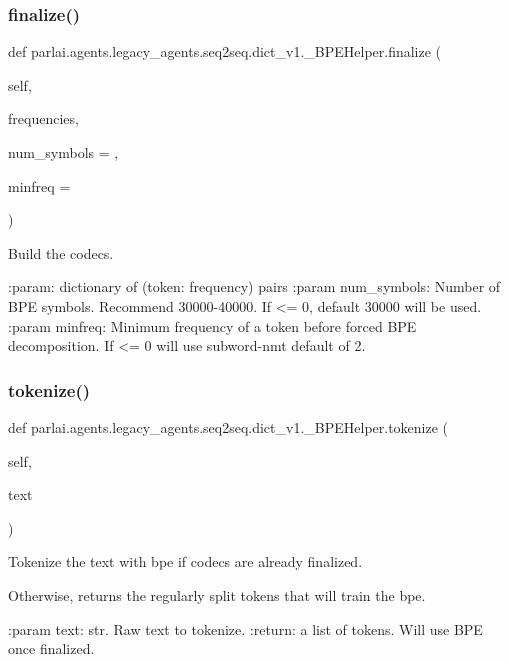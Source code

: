 \subsubsection{\texorpdfstring{finalize()}{finalize()}}
{\footnotesize\ttfamily def parlai.\+agents.\+legacy\+\_\+agents.\+seq2seq.\+dict\+\_\+v1.\+\_\+\+B\+P\+E\+Helper.\+finalize (\begin{DoxyParamCaption}\item[{}]{self,  }\item[{}]{frequencies,  }\item[{}]{num\+\_\+symbols = {},  }\item[{}]{minfreq = {} }\end{DoxyParamCaption})}

\begin{DoxyVerb}Build the codecs.

:param: dictionary of (token: frequency) pairs
:param num_symbols: Number of BPE symbols. Recommend 30000-40000.
    If <= 0, default 30000 will be used.
:param minfreq: Minimum frequency of a token before forced BPE
    decomposition. If <= 0 will use subword-nmt default of 2.
\end{DoxyVerb}
 \mbox{\label{classparlai_1_1agents_1_1legacy__agents_1_1seq2seq_1_1dict__v1_1_1__BPEHelper_a4123dd721a13dc6607498ae29d7dd8a3}} 
\subsubsection{\texorpdfstring{tokenize()}{tokenize()}}
{\footnotesize\ttfamily def parlai.\+agents.\+legacy\+\_\+agents.\+seq2seq.\+dict\+\_\+v1.\+\_\+\+B\+P\+E\+Helper.\+tokenize (\begin{DoxyParamCaption}\item[{}]{self,  }\item[{}]{text }\end{DoxyParamCaption})}

\begin{DoxyVerb}Tokenize the text with bpe if codecs are already finalized.

Otherwise, returns the regularly split tokens that will train the bpe.

:param text: str. Raw text to tokenize.
:return: a list of tokens. Will use BPE once finalized.
\end{DoxyVerb}
 

